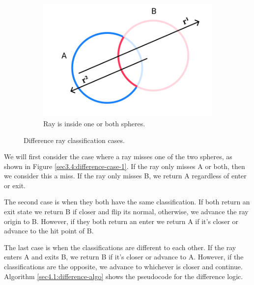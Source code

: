 \documentclass[a4paper,11pt,oneside]{article}
\begin{document}
\begin{figure}[ht]
\begin{subfigure}[b]{0.3\textwidth}
	\end{subfigure}
	\hfill
	\begin{subfigure}[b]{0.3\textwidth}
		\centering
		\includegraphics[width=\textwidth]{section4/4.1/difference-case-3.png}
		\caption{Ray is inside one or both spheres.}
		\label{sec3.4:difference-case-3}
	\end{subfigure}
	\caption{Difference ray classification cases.}
	\label{sec3.4:sphere-difference}
\end{figure}


We will first consider the case where a ray misses one of the two spheres, as shown in Figure \ref{sec3.4:difference-case-1}. If the ray only misses A or both, then we consider this a miss. If the ray only misses B, we return A regardless of enter or exit.

The second case is when they both have the same classification. If both return an exit state we return B if closer and flip its normal, otherwise, we advance the ray origin to B. However, if they both return an enter we return A if it's closer or advance to the hit point of B.

The last case is when the classifications are different to each other. If the ray enters A and exits B, we return B if it's closer or advance to A. However, if the classifications are the opposite, we advance to whichever is closer and continue. Algorithm \ref{sec4.1:difference-algo} shows the pseudocode for the difference logic.
\end{document}
